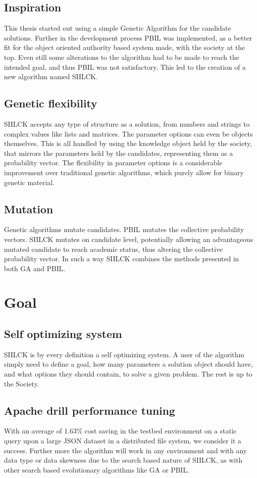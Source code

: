 \documentclass[a4paper,english]{report}
\begin{document}
		\subsection{Inspiration}
		This thesis started out using a simple Genetic Algorithm for the candidate solutions. Further in the development process PBIL was implemented, as a better fit for the object oriented authority based system made, with the society at the top. Even still some alterations to the algorithm had to be made to reach the intended goal, and thus PBIL was not satisfactory. This led to the creation of a new algorithm named SIILCK.
		\subsection{Genetic flexibility}
		SIILCK accepts any type of structure as a solution, from numbers and strings to complex values like lists and matrices. The parameter options can even be objects themselves. This is all handled by using the knowledge object held by the society, that mirrors the parameters held by the candidates, representing them as a probability vector. The flexibility in parameter options is a considerable improvement over traditional genetic algorithms, which purely allow for binary genetic material.
		\subsection{Mutation}
		Genetic algorithms mutate candidates. PBIL mutates the collective probability vectors. SIILCK mutates on candidate level, potentially allowing an advantageous mutated candidate to reach academic status, thus altering the collective probability vector. In such a way SIILCK combines the methods presented in both GA and PBIL.
		\clearpage
		\section{Goal}
		\subsection{Self optimizing system}
		SIILCK is by every definition a self optimizing system. A user of the algorithm simply need to define a goal, how many parameters a solution object should have, and what options they should contain, to solve a given problem. The rest is up to the Society.
		\subsection{Apache drill performance tuning}
		With an average of 1.63\% cost saving in the testbed environment on a static query upon a large JSON dataset in a distributed file system, we consider it a success. Further more the algorithm will work in any environment and with any data type or data skewness due to the search based nature of SIILCK, as with other search based evolutionary algorithms like GA or PBIL.
\end{document}
